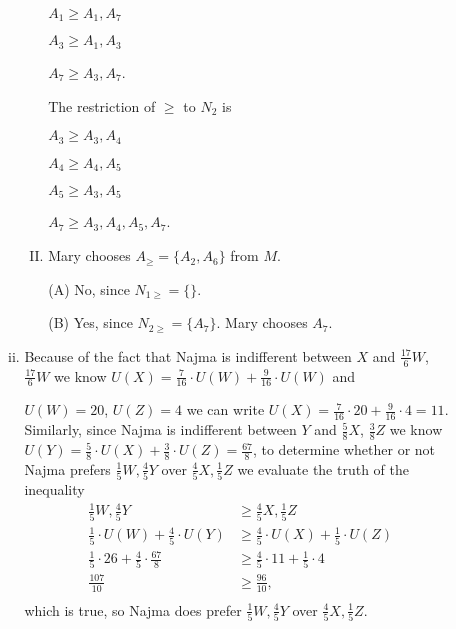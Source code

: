 \documentclass[10pt]{article}
\begin{document}
\begin{enumerate}
\begin{enumerate}
\begin{enumerate}[(i)]
\begin{enumerate}[(I)]
                      $A_1 \geq A_1, A_7$

                      $A_3 \geq A_1, A_3$

                      $A_7 \geq A_3, A_7$.


                  The restriction of $\geq$ to $N_2$ is

                      $A_3 \geq A_3, A_4$

                      $A_4 \geq A_4, A_5$

                      $A_5 \geq A_3, A_5$

                      $A_7 \geq A_3, A_4, A_5, A_7$.

                    \item Mary chooses $A_\geq = \{A_2, A_6\}$ from $M$.

                    (A) No, since $N_{1\geq} = \{\}$.

                    (B) Yes, since $N_{2\geq} = \{A_7\}$. Mary chooses $A_7$.
                \end{enumerate}
              \item Because of the fact that Najma is indifferent between $X$ and $\tfrac{17}{6}W$, $\tfrac{17}{6}W$ we know
                  $U(X) = \tfrac{7}{16}\cdot U(W) + \tfrac{9}{16} \cdot U(W)$
                  and 

                  $U(W) = 20$, $U(Z) = 4$ we can write
                  $U(X) = \tfrac{7}{16}\cdot 20 + \tfrac{9}{16} \cdot 4 = 11$.
                  Similarly, since Najma is indifferent between $Y$ and $\tfrac{5}{8}X$, $\tfrac{3}{8}Z$ we know
                  $U(Y) = \tfrac{5}{8}\cdot U(X) + \tfrac{3}{8} \cdot U(Z) =
                  \tfrac{67}{8}$, to determine whether or not Najma prefers
                  $\tfrac{1}{5}W, \tfrac{4}{5}Y$ over $\tfrac{4}{5}X, \tfrac{1}{5}Z$ we evaluate the truth of the inequality
                  \begin{align*}
                    \tfrac{1}{5}W, \tfrac{4}{5}Y &\geq \tfrac{4}{5}X, \tfrac{1}{5}Z \\
                    \tfrac{1}{5}\cdot U(W) + \tfrac{4}{5}\cdot U(Y) &\geq \tfrac{4}{5}\cdot U(X) + \tfrac{1}{5}\cdot U(Z) \\
                    \tfrac{1}{5}\cdot 26 + \tfrac{4}{5}\cdot \tfrac{67}{8} &\geq \tfrac{4}{5}\cdot 11 + \tfrac{1}{5}\cdot 4 \\
                    \tfrac{107}{10} &\geq \tfrac{96}{10}, \\
                  \end{align*}
                  which is true, so Najma does prefer
                  $\tfrac{1}{5}W, \tfrac{4}{5}Y$ over $\tfrac{4}{5}X, \tfrac{1}{5}Z$.
            \end{enumerate}
      \end{enumerate}
  \end{enumerate}
\end{document}
